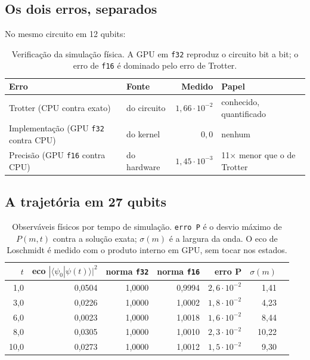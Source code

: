 \documentclass[11pt,a4paper]{article}
\begin{document}
\subsection{Os dois erros, separados}

No mesmo circuito em 12 qubits:

\begin{table}[h]
\centering
\begin{tabular}{llrl}
\toprule
Erro & Fonte & Medido & Papel \\
\midrule
Trotter (CPU contra exato) & do circuito & $1{,}66\cdot10^{-2}$ & conhecido, quantificado \\
Implementação (GPU \texttt{f32} contra CPU) & do kernel & $0{,}0$ & nenhum \\
Precisão (GPU \texttt{f16} contra CPU) & do hardware & $1{,}45\cdot10^{-3}$ & 11$\times$ menor que o de Trotter \\
\bottomrule
\end{tabular}
\caption{Verificação da simulação física. A GPU em \texttt{f32} reproduz o
circuito bit a bit; o erro de \texttt{f16} é dominado pelo erro de Trotter.}
\end{table}

\subsection{A trajetória em 27 qubits}

\begin{table}[h]
\centering
\begin{tabular}{rrrrrrr}
\toprule
$t$ & eco $|\langle\psi_0|\psi(t)\rangle|^2$ & norma \texttt{f32} & norma \texttt{f16} & erro P & $\sigma(m)$ \\
\midrule
1,0 & 0,0504 & 1,0000 & 0,9994 & $2{,}6\cdot10^{-2}$ & 1,41 \\
3,0 & 0,0226 & 1,0000 & 1,0002 & $1{,}8\cdot10^{-2}$ & 4,23 \\
6,0 & 0,0023 & 1,0000 & 1,0018 & $1{,}6\cdot10^{-2}$ & 8,44 \\
8,0 & 0,0305 & 1,0000 & 1,0010 & $2{,}3\cdot10^{-2}$ & 10,22 \\
10,0 & 0,0273 & 1,0000 & 1,0012 & $1{,}5\cdot10^{-2}$ & 9,30 \\
\bottomrule
\end{tabular}
\caption{Observáveis físicos por tempo de simulação. \texttt{erro P} é o
desvio máximo de $P(m,t)$ contra a solução exata; $\sigma(m)$ é a largura da
onda. O eco de Loschmidt é medido com o produto interno em GPU, sem tocar nos
estados.}
\end{table}
\end{document}
